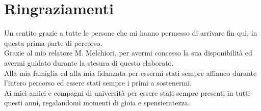 \chapter*{Ringraziamenti}
Un sentito grazie a tutte le persone che mi hanno permesso di arrivare fin qui,
in questa prima parte di percorso.\\
Grazie al mio relatore M. Melchiori, per avermi concesso la sua disponibilità ed
avermi guidato durante la stesura di questo elaborato.\\
Alla mia famiglia ed alla mia fidanzata per essermi stati sempre affianco durante
l'intero percorso ed essere stati sempre i primi a sostenermi.\\
Ai miei amici e compagni di università per essere stati sempre presenti in tutti
questi anni, regalandomi momenti di gioia e spensieratezza.


